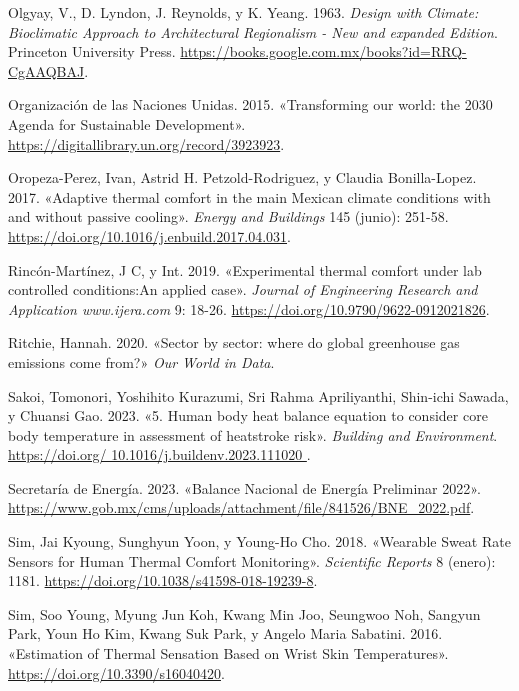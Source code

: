 \documentclass[
  12pt,
  letterpaper,
  DIV=11,
  numbers=noendperiod]{scrreport}
\newlength{\cslhangindent}
\newlength{\cslentryspacingunit} %
\newenvironment{CSLReferences}[2] %
 {%
  \setlength{\parindent}{0pt}
  \ifodd #1
  \let\oldpar\par
  \def\par{\hangindent=\cslhangindent\oldpar}
  \fi
  \setlength{\parskip}{#2\cslentryspacingunit}
 }%
 {}
\begin{document}
\begin{CSLReferences}{1}{0}
\leavevmode{}%
Olgyay, V., D. Lyndon, J. Reynolds, y K. Yeang. 1963. \emph{Design with
Climate: Bioclimatic Approach to Architectural Regionalism - New and
expanded Edition}. Princeton University Press.
\url{https://books.google.com.mx/books?id=RRQ-CgAAQBAJ}.

\leavevmode{}%
Organización de las Naciones Unidas. 2015. {«Transforming our world: the
2030 Agenda for Sustainable Development»}.
\url{https://digitallibrary.un.org/record/3923923}.

\leavevmode{}%
Oropeza-Perez, Ivan, Astrid H. Petzold-Rodriguez, y Claudia
Bonilla-Lopez. 2017. {«Adaptive thermal comfort in the main Mexican
climate conditions with and without passive cooling»}. \emph{Energy and
Buildings} 145 (junio): 251-58.
\url{https://doi.org/10.1016/j.enbuild.2017.04.031}.

\leavevmode{}%
Rincón-Martínez, J C, y Int. 2019. {«Experimental thermal comfort under
lab controlled conditions:An applied case»}. \emph{Journal of
Engineering Research and Application www.ijera.com} 9: 18-26.
\url{https://doi.org/10.9790/9622-0912021826}.

\leavevmode{}%
Ritchie, Hannah. 2020. {«Sector by sector: where do global greenhouse
gas emissions come from?»} \emph{Our World in Data}.

\leavevmode{}%
Sakoi, Tomonori, Yoshihito Kurazumi, Sri Rahma Apriliyanthi, Shin-ichi
Sawada, y Chuansi Gao. 2023. {«5. Human body heat balance equation to
consider core body temperature in assessment of heatstroke risk»}.
\emph{Building and Environment}.
\href{https://doi.org/\%2010.1016/j.buildenv.2023.111020\%20}{https://doi.org/
10.1016/j.buildenv.2023.111020 }.

\leavevmode{}%
Secretaría de Energía. 2023. {«Balance Nacional de Energía Preliminar
2022»}.
\url{https://www.gob.mx/cms/uploads/attachment/file/841526/BNE_2022.pdf}.

\leavevmode{}%
Sim, Jai Kyoung, Sunghyun Yoon, y Young-Ho Cho. 2018. {«Wearable Sweat
Rate Sensors for Human Thermal Comfort Monitoring»}. \emph{Scientific
Reports} 8 (enero): 1181.
\url{https://doi.org/10.1038/s41598-018-19239-8}.

\leavevmode{}%
Sim, Soo Young, Myung Jun Koh, Kwang Min Joo, Seungwoo Noh, Sangyun
Park, Youn Ho Kim, Kwang Suk Park, y Angelo Maria Sabatini. 2016.
{«Estimation of Thermal Sensation Based on Wrist Skin Temperatures»}.
\url{https://doi.org/10.3390/s16040420}.


\end{CSLReferences}
\end{document}
